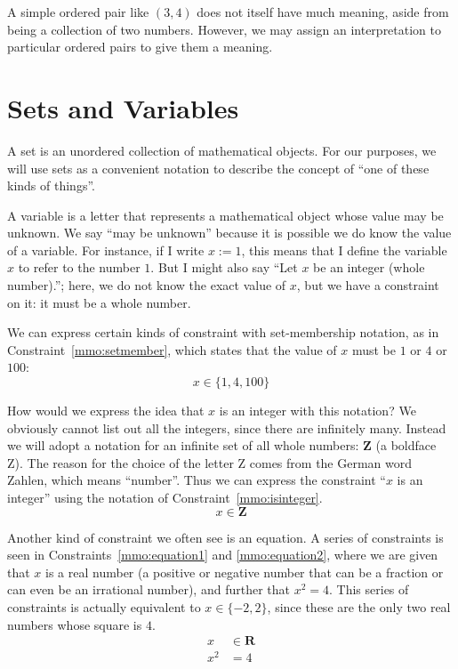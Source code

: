 \documentclass[a4paper,10pt]{report}
\begin{document}
A simple ordered pair like \((3, 4)\) does not itself have much meaning, aside from being a
collection of two numbers. However, we may assign an interpretation to particular ordered
pairs to give them a meaning.

\section{Sets and Variables}

A set is an unordered collection of mathematical objects. For our purposes, we will use sets
as a convenient notation to describe the concept of ``one of these kinds of things''.

A variable is a letter that represents a mathematical object whose value may be unknown. We
say ``may be unknown'' because it is possible we do know the value of a variable. For
instance, if I write \(x := 1\), this means that I define the variable \(x\) to refer to the
number \(1\). But I might also say ``Let \(x\) be an integer (whole number).''; here, we do
not know the exact value of \(x\), but we have a constraint on it: it must be a whole
number.

We can express certain kinds of constraint with set-membership notation, as in
Constraint~\ref{mmo:setmember}, which states that the value of \(x\) must be \(1\) or \(4\)
or \(100\):
\begin{equation}
  x \in \{1, 4, 100\}
  \label{mmo:setmember}
\end{equation}

How would we express the idea that \(x\) is an integer with this notation? We obviously
cannot list out all the integers, since there are infinitely many. Instead we will adopt a
notation for an infinite set of all whole numbers: \(\mathbf{Z}\) (a boldface Z). The reason
for the choice of the letter Z comes from the German word Zahlen, which means ``number''.
Thus we can express the constraint ``\(x\) is an integer'' using the notation of
Constraint~\ref{mmo:isinteger}.
\begin{equation}
  x \in \mathbf{Z}
  \label{mmo:isinteger}
\end{equation}

Another kind of constraint we often see is an equation. A series of constraints is seen in
Constraints~\ref{mmo:equation1} and \ref{mmo:equation2}, where we are given that \(x\) is a
real number (a positive or negative number that can be a fraction or can even be an
irrational number), and further that \(x^2 = 4\). This series of constraints is actually
equivalent to \(x \in \{-2, 2\}\), since these are the only two real numbers whose square
is \(4\).
\begin{align}
  x &\in \mathbf{R}
  \label{mmo:equation1}
  \\
  x^2 &= 4
  \label{mmo:equation2}
\end{align}
\end{document}
